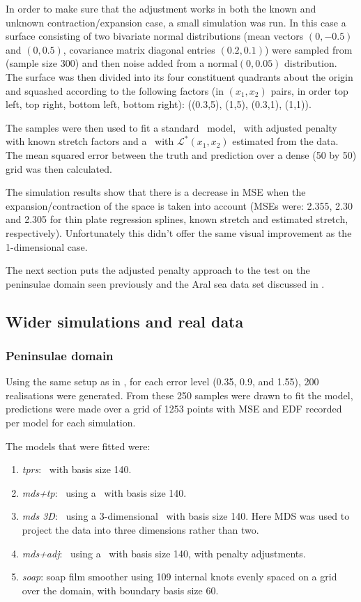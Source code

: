 In order to make sure that the adjustment works in both the known and unknown contraction/expansion case, a small simulation was run. In this case a surface consisting of two bivariate normal distributions (mean vectors $(0,-0.5)$ and $(0,0.5)$, covariance matrix diagonal entries $(0.2,0.1)$) were sampled from (sample size 300) and then noise added from a $\text{normal}(0,0.05)$ distribution. The surface was then divided into its four constituent quadrants about the origin and squashed according to the following factors (in $(x_1,x_2)$ pairs, in order top left, top right, bottom left, bottom right): ((0.3,5), (1,5), (0.3,1), (1,1)).

The samples were then used to fit a standard \tprs\ model, \tprs\ with adjusted penalty with known stretch factors and a \tprs\ with $\mathcal{L}^*(x_1,x_2)$ estimated from the data. The mean squared error between the truth and prediction over a dense (50 by 50) grid was then calculated.

\label{cor-4s10}The simulation results show that there is a decrease in MSE when the expansion/contraction of the space is taken into account (MSEs were: 2.355, 2.30 and 2.305 for thin plate regression splines, known stretch and estimated stretch, respectively). Unfortunately this didn't offer the same visual improvement as the 1-dimensional case.

The next section puts the adjusted penalty approach to the test on the peninsulae domain seen previously and the Aral sea data set discussed in .

\subsection{Wider simulations and real data}

\subsubsection{Peninsulae domain}
\label{wt2bigsim}

Using the same setup as in , for each error level (0.35, 0.9, and 1.55), 200 realisations were generated. From these 250 samples were drawn to fit the model, predictions were made over a grid of 1253 points with MSE and EDF recorded per model for each simulation. 

The models that were fitted were:
\begin{enumerate}
\item \emph{tprs}: \tprs\ with basis size 140.
\item \emph{mds+tp}: \mdsap\ using a \tprs\ with basis size 140.
\item \emph{mds 3D}: \mdsap\ using a 3-dimensional \tprs\ with basis size 140. Here MDS was used to project the data into three dimensions rather than two.
\item \emph{mds+adj}: \mdsap\ using a \tprs\ with basis size 140, with penalty adjustments.
\item \emph{soap}: soap film smoother using 109 internal knots evenly spaced on a grid over the domain, with boundary basis size 60.
\end{enumerate}

